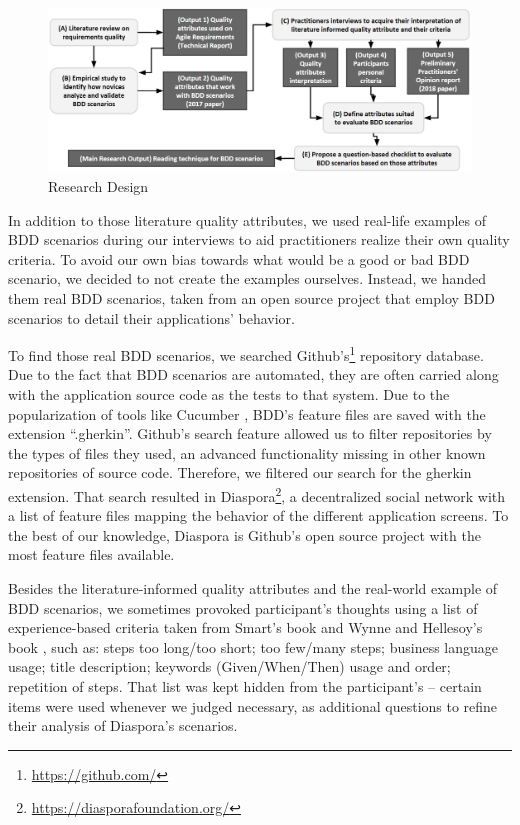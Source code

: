 \begin{figure}[t]
\centering
\includegraphics[width=.9\textwidth]{images/Research_Plan}
\caption{Research Design}
\label{fig:research_design}
\end{figure}

In addition to those literature quality attributes, we used real-life examples of BDD scenarios during our interviews to aid practitioners realize their own quality criteria. To avoid our own bias towards what would be a good or bad BDD scenario, we decided to not create the examples ourselves. Instead, we handed them real BDD scenarios, taken from an open source project that employ BDD scenarios to detail their applications' behavior. 

To find those real BDD scenarios, we searched Github's\footnote{\url{https://github.com/}} repository database. Due to the fact that BDD scenarios are automated, they are often carried along with the application source code as the tests to that system. Due to the popularization of tools like Cucumber \cite{Wynne_and_Hellesoy_2012}, BDD's feature files are saved with the extension ``.gherkin''. Github's search feature allowed us to filter repositories by the types of files they used, an advanced functionality missing in other known repositories of source code. Therefore, we filtered our search for the gherkin extension. That search resulted in Diaspora\footnote{\url{https://diasporafoundation.org/}}, a decentralized social network with a list of feature files mapping the behavior of the different application screens. To the best of our knowledge, Diaspora is Github's open source project with the most feature files available.

Besides the literature-informed quality attributes and the real-world example of BDD scenarios, we sometimes provoked participant's thoughts using a list of experience-based criteria taken from Smart's book \cite{Smart_2014} and Wynne and Hellesoy's book \cite{Wynne_and_Hellesoy_2012}, such as: steps too long/too short; too few/many steps; business language usage; title description; keywords (Given/When/Then) usage and order; repetition of steps. That list was kept hidden from the participant's -- certain items were used whenever we judged necessary, as additional questions to refine their analysis of Diaspora's scenarios.

